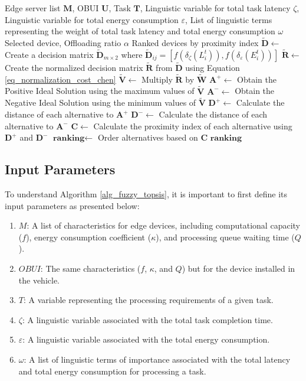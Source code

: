 \documentclass[iicol]{sn-jnl}
\begin{document}
\begin{algorithm}
    \caption{Fuzzy TOPSIS function}\label{alg_fuzzy_topsis}
    \begin{algorithmic}[1]
    \Require Edge server list $\mathbf{M}$, OBUI $\mathbf{U}$, Task $\mathbf{T}$, Linguistic variable for total task latency $\zeta$, Linguistic variable for total energy consumption $\varepsilon$, List of linguistic terms representing the weight of total task latency and total energy consumption $\omega$
    \Ensure Selected device, Offloading ratio $\alpha$
    \Ensure Ranked devices by proximity index
    \State $\mathbf{\tilde{D}} \gets$ Create a decision matrix $\mathbf{\tilde{D}}_{m\times2}$ where $\mathbf{\tilde{D}}_{ij} = \left[ f(\delta_\zeta(L^t_i)), f(\delta_\varepsilon(E^t_i)) \right]$
    \State $\mathbf{\tilde{R}} \gets$ Create the normalized decision matrix $\mathbf{\tilde{R}}$ from $\mathbf{\tilde{D}}$ using Equation \eqref{eq_normalization_cost_chen}
    \State $\mathbf{\tilde{V}} \gets$ Multiply $\mathbf{\tilde{R}}$ by $\mathbf{\tilde{W}}$
    \State $\mathbf{A}^+ \gets$ Obtain the Positive Ideal Solution using the maximum values of $\mathbf{\tilde{V}}$
    \State $\mathbf{A}^- \gets$ Obtain the Negative Ideal Solution using the minimum values of $\mathbf{\tilde{V}}$
    \State $\mathbf{D}^+ \gets$ Calculate the distance of each alternative to $\mathbf{A}^+$
    \State $\mathbf{D}^- \gets$ Calculate the distance of each alternative to $\mathbf{A}^-$
    \State $\mathbf{C} \gets$ Calculate the proximity index of each alternative using $\mathbf{D}^+$ and $\mathbf{D}^-$
    \State $\textbf{ranking} \gets$ Order alternatives based on $\mathbf{C}$
    \State \Return $\textbf{ranking}$
    \end{algorithmic}
\end{algorithm}


\subsection{Input Parameters}

To understand Algorithm \ref{alg_fuzzy_topsis}, it is important to first define its input parameters as presented below:

\begin{enumerate}
    \item $M$: A list of characteristics for edge devices, including computational capacity ($f$), energy consumption coefficient ($\kappa$), and processing queue waiting time ($Q$).
    \item $OBUI$: The same characteristics ($f$, $\kappa$, and $Q$) but for the device installed in the vehicle.
    \item $T$: A variable representing the processing requirements of a given task.
    \item $\zeta$: A linguistic variable associated with the total task completion time.
    \item $\varepsilon$: A linguistic variable associated with the total energy consumption.
    \item $\omega$: A list of linguistic terms of importance associated with the total latency and total energy consumption for processing a task.
\end{enumerate}
\end{document}
